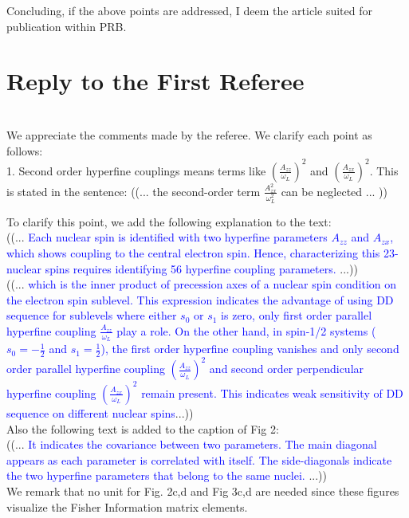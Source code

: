 \documentclass[12pt]{amsart}
\begin{document}
	Concluding, if the above points are addressed, I deem the article
	suited for publication within PRB.
	
	\color{black} \section*{Reply to the First Referee}\\
	We appreciate the comments made by the referee. We clarify each point as follows:\\
	
	1. Second order hyperfine couplings means terms like $(\frac{A_{zz}}{\omega_L})^2$ and $(\frac{A_{zx}}{\omega_L})^2$. This is stated in the sentence:
	((... the second-order term $\frac{A_{zx}^2}{\omega_L^2}$ can be neglected ... ))
	
	To clarify this point, we add the following explanation to the text:\\
	((... \textcolor{blue}{Each nuclear spin is identified with two hyperfine parameters $A_{zz}$ and $A_{zx}$, which shows coupling to the central electron spin. Hence, characterizing this 23-nuclear spins requires identifying 56 hyperfine coupling parameters.} ...)) \\
	
	((... \textcolor{blue}{which is the inner product of precession axes of a nuclear spin condition on the electron spin sublevel. This expression indicates the advantage of using DD sequence for sublevels where either $s_0$ or $s_1$ is zero, only first order parallel hyperfine coupling $\frac{A_{zz}}{\omega_L}$ play a role. On the other hand, in spin-1/2 systems ($s_0=-\frac{1}{2}$ and $s_1=\frac{1}{2}$), the first order hyperfine coupling vanishes and only second order parallel hyperfine coupling $(\frac{A_{zz}}{\omega_L})^2$ and second order perpendicular hyperfine coupling $(\frac{A_{zx}}{\omega_L})^2$ remain present. This indicates weak sensitivity of DD sequence on different nuclear spins}...))\\
	
	Also the following text is added to the caption of Fig 2:\\
	((... \textcolor{blue}{It indicates the covariance between two parameters. The main diagonal appears as each parameter is correlated with itself. The side-diagonals indicate the two hyperfine parameters that belong to the same nuclei.} ...)) \\
	
	We remark that no unit for Fig. 2c,d and Fig 3c,d are needed since these figures visualize the Fisher Information matrix elements. 
	
\end{document}
